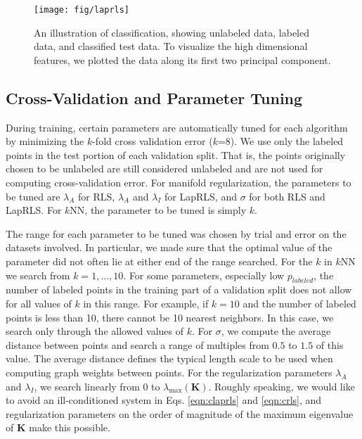 \documentclass[anon,11pt]{9520} %
\newcommand{\mb}{\mathbf}
\begin{document}
\begin{figure}[h!]
\begin{center}
\texttt{[image: fig/laprls]}
\end{center}
\caption{\label{fig:pca} An illustration of classification, showing unlabeled data, labeled
  data, and classified test data. To visualize the high dimensional features, we
  plotted the data along its first two principal component.}
\end{figure} 

\subsection{Cross-Validation and Parameter Tuning}
During training, certain parameters are automatically tuned for each algorithm
by minimizing the $k$-fold cross validation error ($k$=8). We use only the
labeled points in the test portion of each validation split. That is, the points
originally chosen to be unlabeled are still considered unlabeled and are not
used for computing cross-validation error. For manifold regularization, the
parameters to be tuned are $\lambda_A$ for RLS, $\lambda_A$ and $\lambda_I$ for
LapRLS, and $\sigma$ for both RLS and LapRLS. For $k$NN, the parameter to be
tuned is simply $k$.

The range for each parameter to be tuned was chosen by trial and error on the
datasets involved. In particular, we made sure that the optimal value of the
parameter did not often lie at either end of the range searched. For the $k$ in
$k$NN we search from $k = 1, \dots, 10$. For some parameters, especially low
$p_{labeled}$, the number of labeled points in the training part of a validation
split does not allow for all values of $k$ in this range. For example, if $k =
10$ and the number of labeled points is less than 10, there cannot be 10 nearest
neighbors. In this case, we search only through the allowed values of $k$. For
$\sigma$, we compute the average distance between points and search a range of
multiples from $0.5$ to $1.5$ of this value. The average distance defines the
typical length scale to be used when computing graph weights between points. For
the regularization parameters $\lambda_A$ and $\lambda_I$, we search linearly
from 0 to $\lambda_{\max}(\mb{K})$. Roughly speaking, we would like to avoid an
ill-conditioned system in Eqs. \ref{eqn:claprls} and \ref{eqn:crls}, and
regularization parameters on the order of magnitude of the maximum eigenvalue of
$\mb K$ make this possible.
\end{document}
